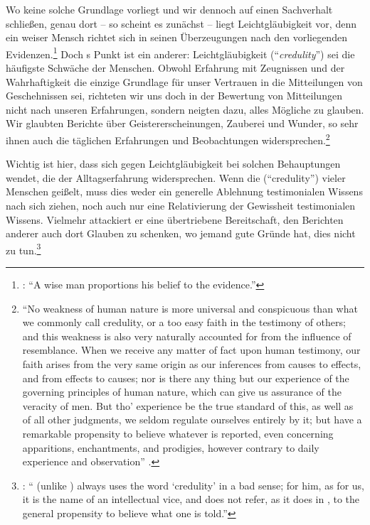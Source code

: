 Wo keine solche Grundlage vorliegt und wir dennoch auf einen
Sachverhalt schließen, genau dort -- so scheint es zunächst -- liegt
Leichtgläubigkeit vor, denn ein weiser Mensch richtet sich in seinen
Überzeugungen nach den vorliegenden
Evidenzen.\footnote{\cite[Vgl.][89]{Hume:AnEnquiryConcerningHumanUnderstanding1964}:
\enquote{A wise man {\punkt} proportions his belief to the evidence.}} Doch
s Punkt ist ein anderer: Leichtgläubigkeit
(\enquote{\emph{credulity}}) sei die häufigste Schwäche der Menschen. Obwohl
Erfahrung mit Zeugnissen und der Wahrhaftigkeit die einzige Grundlage für
unser Vertrauen in die Mitteilungen von Geschehnissen sei, richteten wir uns
doch in der Bewertung von Mitteilungen nicht nach unseren Erfahrungen, sondern
neigten dazu, alles Mögliche zu glauben. Wir glaubten Berichte über
Geistererscheinungen, Zauberei und Wunder, so sehr ihnen auch die täglichen
Erfahrungen und Beobachtungen widersprechen.\footnote{\enquote{No weakness of
human nature is more universal and conspicuous than what we commonly call
credulity, or a too easy faith in the testimony of others; and this weakness is
also very naturally accounted for from the influence of resemblance. When we
receive any matter of fact upon human testimony, our faith arises from the very
same origin as our inferences from causes to effects, and from effects to
causes; nor is there any thing but our experience of the governing principles of
human nature, which can give us assurance of the veracity of men. But tho’
experience be the true standard of this, as well as of all other judgments, we
seldom regulate ourselves entirely by it; but have a remarkable propensity to
believe whatever is reported, even concerning apparitions, enchantments, and
prodigies, however contrary to daily experience and observation}
\parencite[][78]{Hume:ATreatiseofHumenNature2007}.}


Wichtig ist hier, dass  sich gegen
Leichtgläubigkeit bei solchen Behauptungen wendet, die der Alltagserfahrung
widersprechen. Wenn  die 
(\enquote{credulity}) vieler Menschen geißelt, muss dies weder ein generelle
Ablehnung testimonialen Wissens nach sich ziehen, noch auch nur eine
Relativierung der Gewissheit testimonialen Wissens. Vielmehr attackiert er eine
übertriebene Bereitschaft, den Berichten anderer auch dort Glauben zu schenken,
wo jemand gute Gründe hat, dies nicht zu
tun.\footnote{\cite[Vgl.][420]{Welbourne:IsHumeReallyaReductivist2002}:
\enquote{ (unlike ) always uses the word
\enquote{credulity} in a bad sense; for him, as for us, it is the name of an
intellectual vice, and does not refer, as it does in , to the
general propensity to believe what one is told.}}


